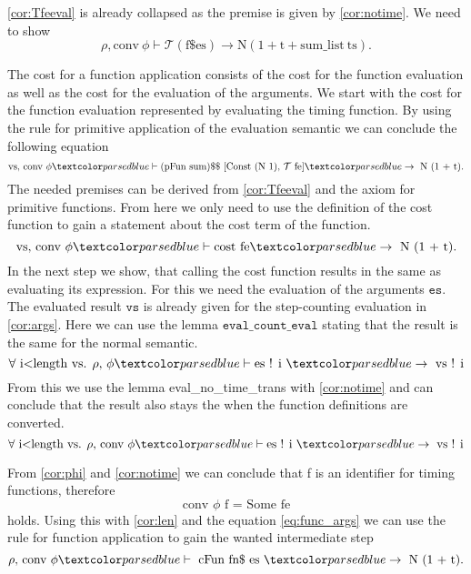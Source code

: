 \ref{cor:Tfeeval} is already collapsed as the premise is given by \ref{cor:notime}.
We need to show
\begin{equation*}
  \rho, \text{conv}\ \phi \vdash\mathcal{T} (\text{f\$ es})\rightarrow \text{N} (1 + \text{t} + \text{sum\_list}\ \text{ts}).
\end{equation*}

The cost for a function application consists of the cost for the function evaluation as well as the cost for the evaluation of the arguments.
We start with the cost for the function evaluation represented by evaluating the timing function.
By using the rule for primitive application of the evaluation semantic we can conclude the following equation
\begin{equation*}
\text{vs, conv } \phi \hvdash \text{(pFun sum)\$\$ } [  \text{Const (N 1), } \mathcal{T}\ \text{fe} ] \hrightarrow \text{ N (1 + t)}.
\end{equation*}
The needed premises can be derived from \ref{cor:Tfeeval} and the axiom for primitive functions. From here we only need to use the definition of the cost function to gain a statement about the cost term of the function.
\begin{equation}
\text{vs, conv } \phi \hvdash \text{cost fe} \hrightarrow \text{ N (1 + t)}.
\end{equation}
In the next step we show, that calling the cost function results in the same as evaluating its expression.
For this we need the evaluation of the arguments $\texttt{es}$.
The evaluated result $\texttt{vs}$ is already given for the step-counting evaluation in \ref{cor:args}.
Here we can use the lemma $\texttt{eval\_count\_eval}$ stating that the result is the same for the normal semantic.
\begin{equation*}
\forall \text{ i<length vs. } \rho \text{, } \phi \hvdash \text{es ! i } \hrightarrow \text{ vs ! i}
\end{equation*}
From this we use the lemma eval\_no\_time\_trans with \ref{cor:notime} and can conclude that the result also stays the when the function definitions are converted.
\begin{equation} \label{eq:func_args}
\forall \text{ i<length vs. } \rho \text{, conv}\ \phi \hvdash \text{es ! i } \hrightarrow \text{ vs ! i}
\end{equation}

From \ref{cor:phi} and \ref{cor:notime} we can conclude that f is an identifier for timing functions, therefore
\begin{equation*}
  \text{conv } \phi \text{ f = Some fe}
\end{equation*}
holds.
Using this with \ref{cor:len} and the equation \ref{eq:func_args} we can use the rule for function application to gain the wanted intermediate step
\begin{equation} \label{eq:func_id}
  \rho \text{, conv }\phi \hvdash \text{ cFun fn\$ es } \hrightarrow \text{ N (1 + t).}
\end{equation}

